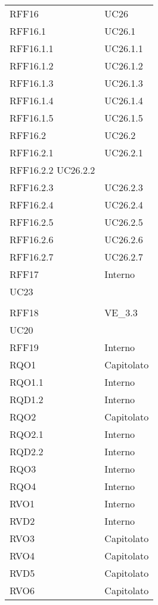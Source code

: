 \begin{longtable}{ >{\centering}p{}
		>{\centering}p{}}
\tabularnewline
RFF16 & UC26 
\tabularnewline
RFF16.1 & UC26.1
\tabularnewline
RFF16.1.1 & UC26.1.1
\tabularnewline
RFF16.1.2 & UC26.1.2
\tabularnewline
RFF16.1.3 & UC26.1.3
\tabularnewline
RFF16.1.4 & UC26.1.4
\tabularnewline
RFF16.1.5 & UC26.1.5
\tabularnewline
RFF16.2 & UC26.2
\tabularnewline
RFF16.2.1 & UC26.2.1
\tabularnewline
RFF16.2.2 UC26.2.2
\tabularnewline
RFF16.2.3 & UC26.2.3
\tabularnewline
RFF16.2.4 & UC26.2.4
\tabularnewline
RFF16.2.5 & UC26.2.5
\tabularnewline
RFF16.2.6 & UC26.2.6
\tabularnewline
RFF16.2.7 & UC26.2.7
\tabularnewline
RFF17 &	Interno\\
UC23\\ 	\tabularnewline
RFF18 &	VE\_3.3\\
UC20   	\tabularnewline
RFF19 &	Interno \tabularnewline
RQO1	&	Capitolato \tabularnewline
RQO1.1	&	Interno \tabularnewline
RQD1.2	&	Interno \tabularnewline
RQO2	&	Capitolato \tabularnewline
RQO2.1	&	Interno \tabularnewline
RQD2.2	&	Interno \tabularnewline
RQO3	&	Interno \tabularnewline
RQO4	&	Interno \tabularnewline
RVO1	&	Interno \tabularnewline
RVD2	&	Interno \tabularnewline
RVO3	&	Capitolato \tabularnewline
RVO4	&	Capitolato \tabularnewline
RVD5	&	Capitolato \tabularnewline
RVO6	&	Capitolato \tabularnewline
		
\end{longtable}



